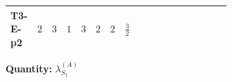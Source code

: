 \documentclass[8pt]{article}
\begin{document}
\begin{landscape}
\begin{longtable}{@{}llcccccc >{\raggedright\arraybackslash}p{0.21\linewidth} >{\raggedright\arraybackslash}p{0.21\linewidth} >{\raggedright\arraybackslash}p{0.21\linewidth}@{}}
T3-E-p2 & $2$ & $3$ & $1$ & $3$ & $2$ & $2$ & $\frac{3}{2}$ & \scriptsize\adjustbox{max width=\linewidth}{$\begin{gathered} {\lambda_{S_1}^{(1)}} \left(\frac{1}{2} T_{\nu}^{(1)}+13 {\lambda_{S_1}^{(A)}}\right)\end{gathered}$} & \scriptsize\adjustbox{max width=\linewidth}{$\begin{gathered} +4 {\lambda_{S_1}^{(A)}} T_{\nu}^{(1)}\end{gathered}$} & \scriptsize\adjustbox{max width=\linewidth}{$\begin{gathered} -\operatorname{Tr}\!\left({y_1}\,\left({y_1}\right)^{\dagger}\,{y_1}\,\left({y_1}\right)^{\dagger}\right)\end{gathered}$} \\
\midrule
\bottomrule
\end{longtable}
\clearpage
\noindent\textbf{Quantity: }$\lambda_{S_1}^{(A)}$\par\smallskip

\end{landscape}
\end{document}

